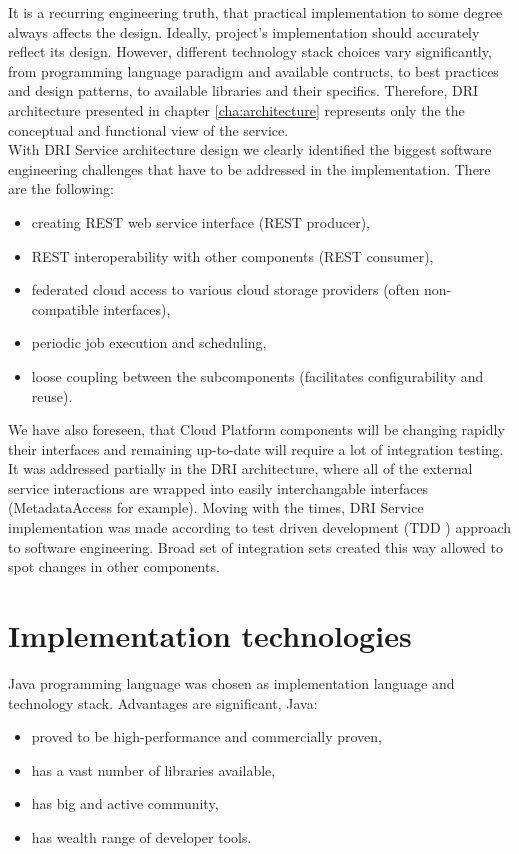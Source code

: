 It is a recurring engineering truth, that practical implementation to some degree
always affects the design. Ideally, project's implementation should accurately reflect
its design. However, different technology stack choices vary significantly, from
programming language paradigm and available contructs, to best practices and design
patterns, to available libraries and their specifics. Therefore, DRI architecture
presented in chapter \ref{cha:architecture} represents only the the conceptual and
functional view of the service.\\

With DRI Service architecture design we clearly identified the biggest software
engineering challenges that have to be addressed in the implementation. There
are the following:

\begin{itemize}
\item creating REST web service interface (REST producer),
\item REST interoperability with other components (REST consumer),
\item federated cloud access to various cloud storage providers (often non-compatible interfaces),
\item periodic job execution and scheduling,
\item loose coupling between the subcomponents (facilitates configurability and reuse).
\end{itemize}

We have also foreseen, that Cloud Platform components will be changing rapidly
their interfaces and remaining up-to-date will require a lot of integration testing.
It was addressed partially in the DRI architecture, where all of the external service
interactions are wrapped into easily interchangable interfaces (MetadataAccess for example).
Moving with the times, DRI Service implementation was made according to
test driven development (TDD \cite{tdd, tdd-java}) approach to software engineering. 
Broad set of integration sets created this way allowed to spot changes in
other components.

\section{Implementation technologies}
Java programming language \cite{java-language} was chosen as implementation
language and technology stack. Advantages are significant, Java:

\begin{itemize}
\item proved to be high-performance and commercially proven,
\item has a vast number of libraries available,
\item has big and active community,
\item has wealth range of developer tools.
\end{itemize}

